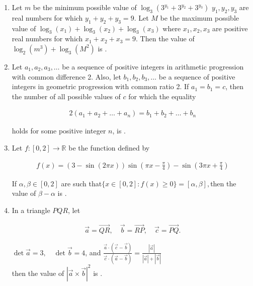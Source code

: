 \documentclass{article}
\begin{document}
\begin{enumerate}
\item   Let $m$ be the minimum possible value of $\log_3(3^{y_1} + 3^{y_2} + 3^{y_3})$ $y_1, y_2, y_3$ are real numbers for which $y_1 + y_2 + y_3 = 9$. Let $M$ be the maximum possible value of $\log_3(x_1) + \log_3(x_2) + \log_3(x_3)$ where $x_1, x_2, x_3$ are positive real numbers for which $x_1 + x_2 + x_3 = 9$. Then the value of $\log_2(m^3) + \log_3(M^2)$ is \underline{\hspace{2cm}}.

\item   Let $a_1, a_2, a_3, \dots $ be a sequence of positive integers in arithmetic progression with common difference 2. Also, let $b_1, b_2, b_3, \dots $ be a sequence of positive integers in geometric progression with common ratio 2. If $a_1 = b_1 = c$, then the number of all possible values of $c$ for which the equality 

\begin{align}
     2(a_1 + a_2 + \dots + a_n) = b_1 + b_2 + \dots + b_n
\end{align}

    holds for some positive integer $n$, is \underline{\hspace{2cm}}.

\item   Let $f: [0,2] \to \mathbb{R}$ be the function defined by

\begin{align}
	f(x) = (3 - \sin (2\pi x) ) \sin (\pi x - \frac{\pi}{4}) - \sin (3\pi x + \frac{\pi}{4})
\end{align}

If $\alpha, \beta \in [0,2]$ are such that$\{ x \in [0,2] : f(x) \geq 0 \} = [\alpha, \beta],$then the value of $\beta - \alpha$ is \underline{\hspace{2cm}}.

\item   In a triangle $PQR$, let 
   
\begin{align}
   \vec{a} = \overrightarrow{QR}, \quad \vec{b} = \overrightarrow{RP}, \quad \vec{c} = \overrightarrow{PQ}.
\end{align}

	$\det{\vec{a}}= 3, \quad \det{\vec{b}} = 4$, and 
	$\frac{\vec{a} \cdot (\vec{c} - \vec{b})}{\vec{c} \cdot (\vec{a} - \vec{b})} = \frac{|\vec{a}|}{|\vec{a}| + |\vec{b}|}$\\

    then the value of $|\vec{a} \times \vec{b}|^2$ is \underline{\hspace{2cm}}.


\end{enumerate}
\end{document}
